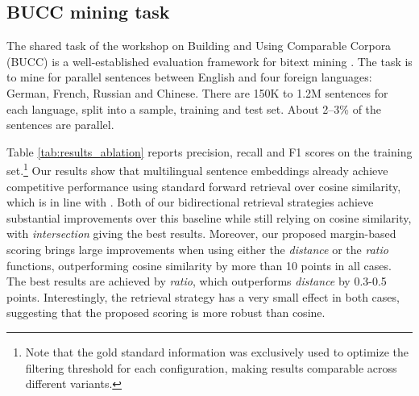 \documentclass[11pt,a4paper]{article}
\begin{document}
\subsection{BUCC mining task} \label{subsec:bucc}

The shared task of the workshop on Building and Using Comparable Corpora (BUCC) is a well-established evaluation framework for bitext mining \citep{zweigenbaum2017overview,zweigenbaum2018overview}. The task is to mine for parallel sentences between English and four foreign languages: German, French, Russian and Chinese. There are 150K to 1.2M sentences for each language, split into a sample, training and test set. About 2--3\% of the sentences are parallel.

Table \ref{tab:results_ablation} reports precision, recall and F1 scores on the training set.\footnote{Note that the gold standard information was exclusively used to optimize the filtering threshold for each configuration, making results comparable across different variants.} Our results show that multilingual sentence embeddings already achieve competitive performance using standard forward retrieval over cosine similarity, which is in line with \citet{schwenk2018filtering}. Both of our bidirectional retrieval strategies achieve substantial improvements over this baseline while still relying on cosine similarity, with \textit{intersection} giving the best results.
Moreover, our proposed margin-based scoring brings large improvements when using either the \textit{distance} or the \textit{ratio} functions, outperforming cosine similarity by more than 10 points in all cases. The best results are achieved by \textit{ratio}, which outperforms \textit{distance} by 0.3-0.5 points. Interestingly, the retrieval strategy has a very small effect in both cases, suggesting that the proposed scoring is more robust than cosine.
\end{document}
